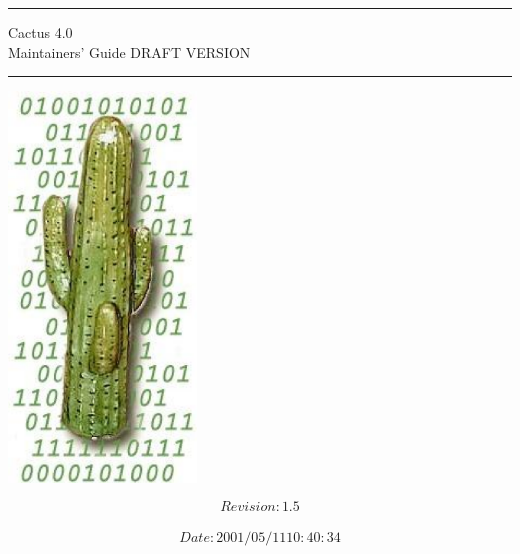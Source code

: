 \documentclass{report}
\newcommand{\cactustitlepage}[4][4.0]
{
\thispagestyle{empty}
\setlength{\parindent}{0mm}
\setlength{\parskip}{0mm}
\vspace*{\stretch{1}}
\rule{\linewidth}{1mm}
\begin{flushright}
  \Huge Cactus #1\\[5mm]
        #2
\end{flushright}
\rule{\linewidth}{1mm}
\vspace*{\stretch{2}}
\begin{center}
\includegraphics[angle=0,width=5cm]{bincactus2.eps}
\end{center}
\vspace*{\stretch{2}}
\begin{center}
   \Large #3 \\[3mm]
          #4
\end{center}
\newpage
}
\begin{document}
\cactustitlepage{Maintainers' Guide DRAFT VERSION}{$$Revision: 1.5 $$}{$$Date: 2001/05/11 10:40:34 $$}

\setcounter{page}{1}


\tableofcontents


\renewcommand{\thepart}{\Alph{part}}
\renewcommand{\thechapter}{\Alph{part}\arabic{chapter}}
\renewcommand{\thepage}{\Alph{part}\arabic{page}}
\pagestyle{fancy}

\newpage

























\end{document}
